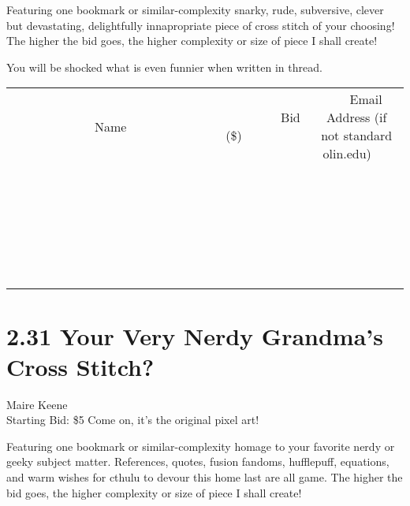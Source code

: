 \documentclass[11pt]{article}
\begin{document}
Featuring one bookmark or similar-complexity snarky, rude, subversive, clever but devastating, delightfully innapropriate piece of cross stitch of your choosing! The higher the bid goes, the higher complexity or size of piece I shall create!

You will be shocked what is even funnier when written in thread.
\\[6ex]
\begin{tabular}{c c c}
~~~~~~~~~~~~~Name~~~~~~~~~~~~~ & ~~~~~~~~~Bid (\$)~~~~~~~~~  & ~~~Email Address (if not standard olin.edu)~~~\\
 & & \\
\hline
 & & \\
\hline
 & & \\
\hline
 & & \\
\hline
 & & \\
\hline
 & & \\
\hline
 & & \\
\hline
 & & \\
\hline
 & & \\
\hline
 & & \\
\hline
 & & \\
\hline
 & & \\
\hline
 & & \\
\hline
 & & \\
\hline
 & & \\
\hline
 & & \\
\hline
 & & \\
\hline
 & & \\
\hline
 & & \\
\hline
 & & \\
\hline
 & & \\
\hline
 & & \\
\hline
 & & \\
\hline
 & & \\
\hline
 & & \\
\hline
 & & \\
\hline
\end{tabular}
\newpage
\section*{2.31 Your Very Nerdy Grandma's Cross Stitch?}
Maire Keene
\\
Starting Bid: \$5
\newline
Come on, it's the original pixel art!

Featuring one bookmark or similar-complexity homage to your favorite nerdy or geeky subject matter. References, quotes, fusion fandoms, hufflepuff, equations, and warm wishes for cthulu to devour this home last are all game.  The higher the bid goes, the higher complexity or size of piece I shall create!
\end{document}
